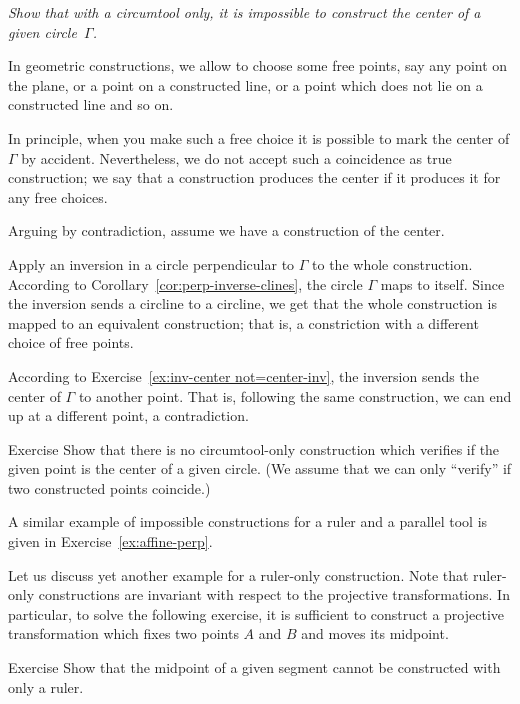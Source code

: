 \textit{Show that with a circumtool only,
it is impossible to construct the center of a given circle~$\Gamma$.}
\medskip

In geometric constructions, we allow to choose some free points,
say any point on the plane, or a point on a constructed line, or a point which does not lie on a constructed line and so on.

In principle, when you make such a free choice it is possible to mark the center of $\Gamma$ by accident.
Nevertheless, we do not accept such a coincidence as true construction; 
we say that a construction produces the center if it produces it for any free choices.


\label{page:solution-for-ex:circumtool}
Arguing by contradiction, 
assume we have a construction of the center. 

Apply an inversion in a circle perpendicular to $\Gamma$ to the whole construction.
According to Corollary~\ref{cor:perp-inverse-clines},
the circle
$\Gamma$ maps to itself.
Since the inversion sends a circline to a circline, we get that the whole  construction is mapped to an equivalent construction; 
that is, a constriction with a different choice of free points.

According to Exercise~\ref{ex:inv-center not=center-inv}, 
the inversion sends the center of $\Gamma$ to another point.
That is, following the same construction, we can end up at a different point, a contradiction.
\qeds

\begin{thm}{Exercise}\label{ex:center-verify}
Show that there is no circumtool-only construction which verifies if the given point is the center of a given circle.
(We assume that we can only ``verify'' if two constructed points coincide.) 
\end{thm}

A similar example of impossible constructions for a ruler and a parallel tool
 is given in Exercise~\ref{ex:affine-perp}.
 
Let us discuss yet another example for a ruler-only construction.
Note that ruler-only constructions are invariant with respect to the projective transformations. 
In particular, to solve the following exercise, it is sufficient to construct a projective transformation which fixes two points $A$ and $B$ and moves its midpoint.

\begin{thm}{Exercise}\label{ex:midpoint-proj}
Show that the midpoint of a given segment cannot be constructed with only a ruler.
\end{thm}

